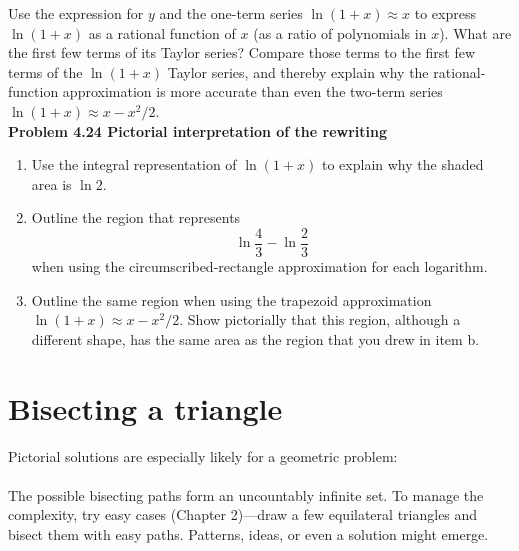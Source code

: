 \documentclass[12pt]{book}
\begin{document}
\colorbox{light-gray}{
\begin{minipage}{\textwidth}
Use the expression for $y$ and the one-term series $\ln(1+x)\approx x$ to express $\ln(1+x)$ as a rational function of $x$ (as a ratio of polynomials in $x$). What are the first few terms of its Taylor series?
Compare those terms to the first few terms of the $\ln(1+x)$ Taylor series, and thereby explain why the rational-function approximation is more accurate than even the two-term series $\ln(1+x)\approx x-x^2\!/2$.\\

{\bf Problem 4.24 Pictorial interpretation of the rewriting}\\
\renewcommand{\labelenumi}{\alph{enumi})}
\begin{enumerate}
\item Use the integral representation of $\ln(1+x)$ to explain why the shaded area is $\ln2$.
\item Outline the region that represents
\begin{equation}
\ln\frac 43 - \ln\frac 23
\end{equation}
when using the circumscribed-rectangle approximation for each logarithm.
\item Outline the same region when using the trapezoid approximation\\ $\ln(1+x)\approx x-x^2\!/2$. Show pictorially that this region, although a different shape, has the same area as the region that you drew in item b.
\end{enumerate}
\end{minipage}
}
\section{ Bisecting a triangle}
Pictorial solutions are especially likely for a geometric problem:\\

\\

\noindent The possible bisecting paths form an uncountably infinite set. To manage the complexity, try easy cases (Chapter 2)—draw a few equilateral triangles and bisect them with easy paths. Patterns, ideas, or even a solution might emerge.\\

\\
\end{document}
